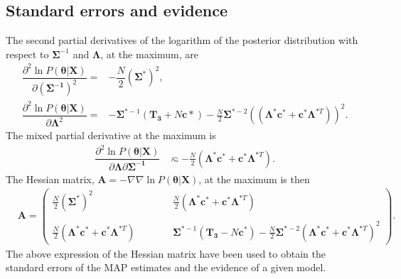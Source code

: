 \documentclass[english,aps, twocolumn, pre,superscriptaddress, notitlepage]{revtex4-1}
\begin{document}
\subsection*{Standard errors and evidence}

The second partial derivatives of the logarithm of the posterior distribution
with respect to $\boldsymbol{\Sigma}^{-1}$ and $\boldsymbol{\Lambda}$,
at the maximum, are\begin{subequations}
\begin{align}
\dfrac{\partial^{2}\ln P\left(\bm{\theta}\vert\bm{X}\right)}{\partial(\bm{\Sigma^{-1}})^{2}}= & -\dfrac{N}{2}\left(\bm{\Sigma}^{*}\right)^{2},\\
\dfrac{\partial^{2}\ln P\left(\bm{\theta}\vert\bm{X}\right)}{\partial\bm{\Lambda}^{2}}= & -\bm{\Sigma}^{*-1}(\bm{T_{3}}+N\boldsymbol{c}*)-\frac{N}{2}\bm{\Sigma}^{*-2}((\bm{\Lambda}^{*}\boldsymbol{c}^{*}+\boldsymbol{c}^{*}\bm{\Lambda}^{*T}))^{2}.
\end{align}
\end{subequations}The mixed partial derivative at the maximum is
\begin{align}
\dfrac{\partial^{2}\ln P\left(\bm{\theta}\vert\bm{X}\right)}{\partial\bm{\Lambda}\partial\bm{\Sigma^{-1}}} & \eqsim-\frac{N}{2}(\bm{\Lambda}^{*}\boldsymbol{c}^{*}+\boldsymbol{c}^{*}\bm{\Lambda}^{*T}).
\end{align}
The Hessian matrix, $\boldsymbol{A}=-\nabla\nabla\ln P\left(\bm{\theta}\vert\bm{X}\right)$,
at the maximum is then
\begin{align}
 & \boldsymbol{A}=\left(\begin{array}{ccc}
\tfrac{N}{2}(\bm{\Sigma}^{*})^{2} & \qquad & \frac{N}{2}(\bm{\Lambda}^{*}\boldsymbol{c}^{*}+\boldsymbol{c}^{*}\bm{\Lambda}^{*T})\\
 & \qquad\\
\frac{N}{2}(\bm{\Lambda}^{*}\boldsymbol{c}^{*}+\boldsymbol{c}^{*}\bm{\Lambda}^{*T})\, & \qquad & \bm{\Sigma}^{*-1}(\bm{T_{3}}-N\boldsymbol{c}^{*})-\frac{N}{2}\bm{\Sigma}^{*-2}(\bm{\Lambda}^{*}\boldsymbol{c}^{*}+\boldsymbol{c}^{*}\bm{\Lambda}^{*T})^{2}
\end{array}\right).
\end{align}
The above expression of the Hessian matrix have been used to obtain
the standard errors of the MAP estimates and the evidence of a given
model.
\end{document}
